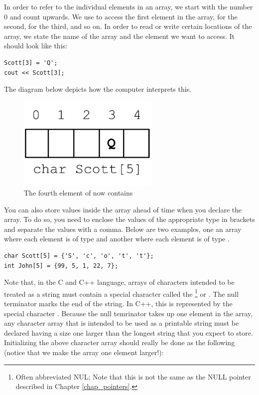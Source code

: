 In order to refer to the individual elements in an array, we start with the number 0 and count upwards. 
We use \Code{[0]} to access the first element in the array, \Code{[1]} for the second, \Code{[2]} for the third, and so on. 
In order to read or write certain locations of the array, we state the name of the array and the element we want to access. 
It should look like this:

\noindent\begin{minipage}{\linewidth}\begin{lstlisting}
Scott[3] = 'Q';
cout << Scott[3];
\end{lstlisting}\end{minipage}

The diagram below depicts how the computer interprets this. \nopagebreak[4]

\begin{figure}[tbh]
  \centering
  \includegraphics[width=0.6\textwidth]{diagrams/array-diagram-2.pdf}
  \caption{The fourth element of  now contains } \label{fig:array-diagram-2}
\end{figure}


You can also store values inside the array ahead of time when you declare the array. 
To do so, you need to enclose the values of the appropriate type in brackets and separate the values with a comma. 
Below are two examples, one an array where each element is of type  and another where each element is of type .

\noindent\begin{minipage}{\linewidth}\begin{lstlisting}
char Scott[5] = {'S', 'c', 'o', 't', 't'};	
int John[5] = {99, 5, 1, 22, 7};
\end{lstlisting}\end{minipage}
	
Note that, in the C and C++ language, arrays of characters intended to be treated as a string must contain a special character called the \footnote{Often abbreviated NUL; Note that this is not the same as the NULL pointer described in Chapter \ref{chap_pointers}.} or . 
The null terminator marks the end of the string. 
In C++, this is represented by the special character . 
Because the null temrinator takes up one element in the array, any character array that is intended to be used as a printable string must be declared having a size one larger than the longest string that you expect to store. 
Initializing the above character array should really be done as the following (notice that we make the array one element larger!):

